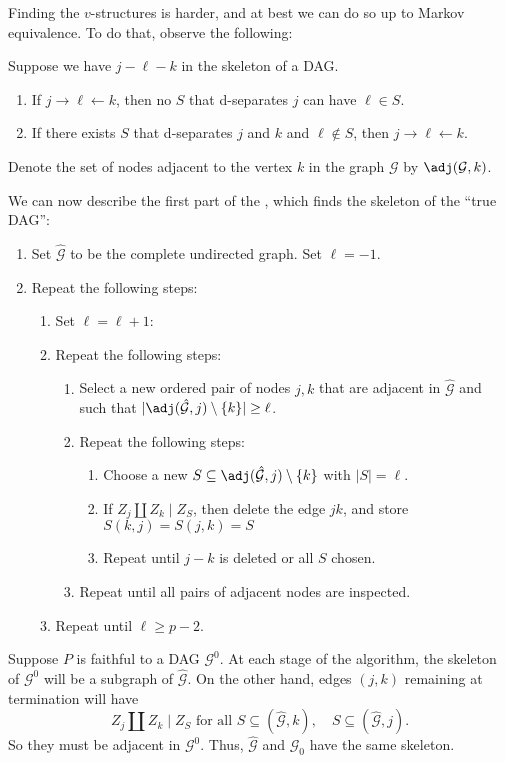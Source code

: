 \documentclass[a4paper]{article}
\begin{document}
Finding the $v$-structures is harder, and at best we can do so up to Markov equivalence. To do that, observe the following:
\begin{prop}
  Suppose we have $j - \ell - k$ in the skeleton of a DAG.
  \begin{enumerate}
    \item If $j \to \ell \leftarrow k$, then no $S$ that d-separates $j$ can have $\ell \in S$.
    \item If there exists $S$ that d-separates $j$ and $k$ and $\ell \not \in S$, then $j \to \ell \leftarrow k$.\fakeqed
  \end{enumerate}
\end{prop}
Denote the set of nodes adjacent to the vertex $k$ in the graph $\mathcal{G}$ by $\adj(\mathcal{G}, k)$.

We can now describe the first part of the , which finds the skeleton of the ``true DAG'':
\begin{enumerate}
  \item Set $\hat{\mathcal{G}}$ to be the complete undirected graph. Set $\ell = -1$.
  \item Repeat the following steps:
    \begin{enumerate}
      \item Set $\ell = \ell + 1$:
      \item Repeat the following steps:
        \begin{enumerate}
          \item Select a new ordered pair of nodes $j, k$ that are adjacent in $\hat{\mathcal{G}}$ and such that $|\adj(\hat{\mathcal{G}}, j) \setminus \{k\}| \geq \ell$.
          \item Repeat the following steps:
            \begin{enumerate}
              \item Choose a new $S \subseteq \adj(\hat{\mathcal{G}}, j) \setminus \{k\}$ with $|S| = \ell$.
              \item If $Z_j \amalg Z_k \mid Z_S$, then delete the edge $jk$, and store $S(k, j) = S(j, k) = S$
              \item Repeat until $j-k$ is deleted or all $S$ chosen.
            \end{enumerate}
          \item Repeat until all pairs of adjacent nodes are inspected.
        \end{enumerate}
      \item Repeat until $\ell \geq p - 2$.
    \end{enumerate}
\end{enumerate}
Suppose $P$ is faithful to a DAG $\mathcal{G}^0$. At each stage of the algorithm, the skeleton of $\mathcal{G}^0$ will be a subgraph of $\hat{\mathcal{G}}$. On the other hand, edges $(j, k)$ remaining at termination will have
\[
  Z_j \amalg Z_k \mid Z_S\text{ for all }S \subseteq (\hat{\mathcal{G}}, k),\quad S \subseteq (\hat{\mathcal{G}}, j).
\]
So they must be adjacent in $\mathcal{G}^0$. Thus, $\hat{\mathcal{G}}$ and $\mathcal{G}_0$ have the same skeleton.
\end{document}
